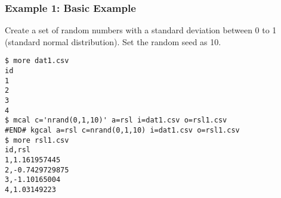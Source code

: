 \subsubsection*{Example 1: Basic Example}

Create a set of random numbers with a standard deviation between 0 to 1  (standard normal distribution). Set the random seed as 10.


\begin{Verbatim}[baselinestretch=0.7,frame=single]
$ more dat1.csv
id
1
2
3
4
$ mcal c='nrand(0,1,10)' a=rsl i=dat1.csv o=rsl1.csv
#END# kgcal a=rsl c=nrand(0,1,10) i=dat1.csv o=rsl1.csv
$ more rsl1.csv
id,rsl
1,1.161957445
2,-0.7429729875
3,-1.10165004
4,1.03149223
\end{Verbatim}
